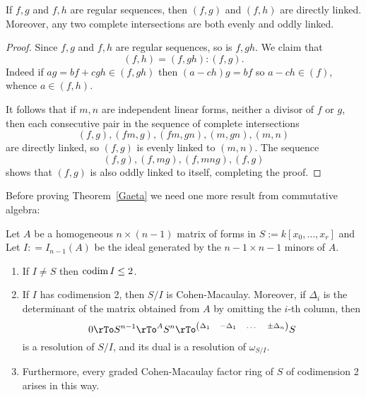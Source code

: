 \begin{lemma}
If $f,g$ and $f,h$ are regular sequences, then $(f,g)$ and $(f,h)$ are directly linked. Moreover, 
any  two complete intersections are both evenly and oddly linked.
\end{lemma}
\begin{proof}
Since $f,g$ and $f,h$ are regular sequences, so is $f,gh$. We claim that
$$
(f,h) = (f,gh):(f,g).
$$
Indeed if $ag = bf+cgh\in (f,gh)$ then $(a-ch)g = bf$ so $a-ch \in (f)$, whence $a\in (f,h)$.

It follows that if $m,n$ are independent linear forms, neither a divisor of $f$ or $g$, then each consecutive pair
in the sequence of complete intersections
$$
(f,g), (fm,g), (fm,gn), (m,gn),(m,n)
$$
are directly linked, so $(f,g)$ is evenly linked to $(m,n)$. The sequence 
$$
(f,g),(f,mg), (f,mng), (f,g)
$$
shows that $(f,g)$ is also oddly linked to itself, completing the proof.
\end{proof}

Before proving Theorem~\ref{Gaeta} we need one more result from commutative algebra:

\begin{theorem}\label{Hilbert-Burch}
Let $A$ be a homogeneous $n\times (n-1)$ matrix of forms in $S := k[x_{0},\dots, x_{r}]$ and
Let  $I: = I_{n-1}(A)$ be the ideal generated by the $n-1\times n-1$ minors of $A$.
\begin{enumerate}
 
\item If $I \neq S$ then $\operatorname{codim} I \leq 2$.
 \item If $I$ has codimension 2, then
$S/I$ is Cohen-Macaulay. Moreover, if $\Delta_{i}$ is the determinant of the matrix obtained
from $A$ by omitting the $i$-th column, then 
$$
0\rTo S^{n-1} \rTo^{A} S^{n}\rTo^{\scriptsize
\begin{pmatrix}
 \Delta_{1}& -\Delta_{1}&\dots&\pm \Delta_{n}
\end{pmatrix}}
S
$$
is a resolution of $S/I$, and its dual is a resolution of $\omega_{S/I}$.
\item Furthermore, every graded Cohen-Macaulay factor ring of $S$ of codimension 2
arises in this way.
\end{enumerate}
\end{theorem}

